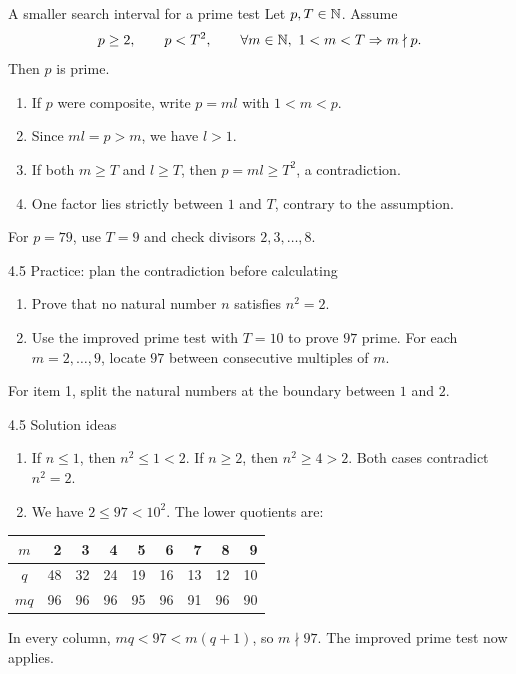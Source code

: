 \begin{frame}{A smaller search interval for a prime test}
Let $p,T\in\mathbb{N}$. Assume
\[
p\ge2,\qquad p<T^2,\qquad
\forall m\in\mathbb{N},\ 1<m<T\Rightarrow m\nmid p.
\]
Then $p$ is prime.
\begin{enumerate}
\item If $p$ were composite, write $p=ml$ with $1<m<p$.
\item Since $ml=p>m$, we have $l>1$.
\item If both $m\ge T$ and $l\ge T$, then $p=ml\ge T^2$, a contradiction.
\item One factor lies strictly between $1$ and $T$, contrary to the assumption.
\end{enumerate}
For $p=79$, use $T=9$ and check divisors $2,3,\ldots,8$.
\end{frame}

\begin{frame}{4.5 Practice: plan the contradiction before calculating}
\begin{enumerate}
\item Prove that no natural number $n$ satisfies $n^2=2$.
\item Use the improved prime test with $T=10$ to prove $97$ prime. For each $m=2,\ldots,9$, locate $97$ between consecutive multiples of $m$.
\end{enumerate}
For item 1, split the natural numbers at the boundary between $1$ and $2$.
\end{frame}

\begin{frame}{4.5 Solution ideas}
\begin{enumerate}
\item If $n\le1$, then $n^2\le1<2$. If $n\ge2$, then $n^2\ge4>2$. Both cases contradict $n^2=2$.
\item We have $2\le97<10^2$. The lower quotients are:
\end{enumerate}
\begin{center}
\begin{tabular}{c|rrrrrrrr}
$m$&2&3&4&5&6&7&8&9\\\hline
$q$&48&32&24&19&16&13&12&10\\
$mq$&96&96&96&95&96&91&96&90
\end{tabular}
\end{center}
In every column, $mq<97<m(q+1)$, so $m\nmid97$. The improved prime test now applies.
\end{frame}


